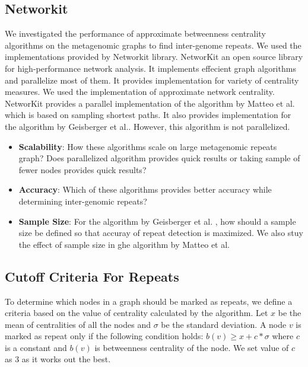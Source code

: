 \documentclass[runningheads,a4paper]{llncs}
\begin{document}
\subsection*{Networkit}
We investigated the performance of approximate betweenness centrality algorithms on the metagenomic graphs to find inter-genome repeats. We used the implementations provided by  Networkit\cite{networkit} library. NetworKit an open source library for high-performance network analysis. It implements effecient graph algorithms and parallelize most of them. It provides implementation for variety of centrality measures. We used the implementation of approximate network centrality. NetworKit provides a parallel implementation of the algorithm by Matteo et al.\cite{matteo} which is based on sampling shortest paths. It also provides implementation for the algorithm by Geisberger et al.\cite{sanders}. However, this algorithm is not parallelized. 

\begin{itemize}
\item \textbf{Scalability}: How these algorithms scale on large metagenomic repeats graph? Does parallelized algorithm provides quick results or taking sample of fewer nodes provides quick results?
\item \textbf{Accuracy}: Which of these algorithms provides better accuracy while determining inter-genomic repeats?
\item \textbf{Sample Size}: For the algorithm by Geisberger et al. \cite{sanders}, how should a sample size be defined so that accuray of repeat detection is maximized. We also stuy the effect of sample size in ghe algorithm by Matteo et al.\cite{matteo}
\end{itemize}


\subsection*{Cutoff Criteria For Repeats}
To determine which nodes in a graph should be marked as repeats, we define a criteria based on the value of centrality calculated by the algorithm. Let $x$ be the mean of centralities of all the nodes and $\sigma$ be the standard deviation. A node $v$ is marked as repeat only if the following condition holds: $b(v) \geq x + c*\sigma$ where $c$ is a constant and $b(v)$ is betweenness centrality of the node. We set value of $c$ as 3 as it works out the best.
\end{document}
